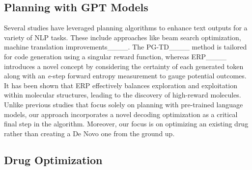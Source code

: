 \subsection{Planning with GPT Models}

Several studies have leveraged planning algorithms to enhance text outputs for a variety of NLP tasks. These include approaches like beam search optimization, machine translation improvements____. The PG-TD____ method is tailored for code generation using a singular reward function, whereas ERP____ introduces a novel concept by considering the certainty of each generated token along with an \emph{e}-step forward entropy measurement to gauge potential outcomes. It has been shown that ERP effectively balances exploration and exploitation within molecular structures, leading to the discovery of high-reward molecules. Unlike previous studies that focus solely on planning with pre-trained language models, our approach incorporates a novel decoding optimization as a critical final step in the algorithm. Moreover, our focus is on optimizing an existing drug rather than creating a De Novo one from the ground up.








\subsection{Drug Optimization}



